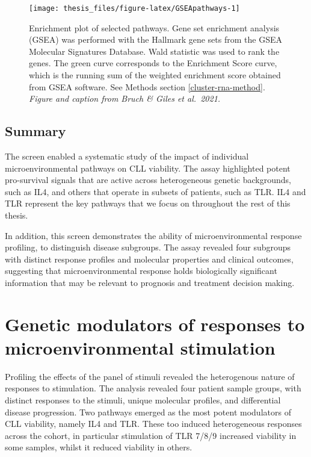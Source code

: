 \documentclass[11pt, a4paper, twosided]{book}
\begin{document}
\begin{figure}

{\centering \texttt{[image: thesis\_files/figure-latex/GSEApathways-1]} 

}

\caption{Enrichment plot of selected pathways. Gene set enrichment analysis (GSEA) was performed with the Hallmark gene sets from the GSEA Molecular Signatures Database. Wald statistic was used to rank the genes. The green curve corresponds to the Enrichment Score curve, which is the running sum of the weighted enrichment score obtained from GSEA software. See Methods section \ref{cluster-rna-method}. \emph{Figure and caption from Bruch \& Giles et al.~2021.}}\label{fig:GSEApathways}
\end{figure}
\hypertarget{summary}{%
\section{Summary}\label{summary}}

The screen enabled a systematic study of the impact of individual microenvironmental pathways on CLL viability. The assay highlighted potent pro-survival signals that are active across heterogeneous genetic backgrounds, such as IL4, and others that operate in subsets of patients, such as TLR. IL4 and TLR represent the key pathways that we focus on throughout the rest of this thesis.

In addition, this screen demonstrates the ability of microenvironmental response profiling, to distinguish disease subgroups. The assay revealed four subgroups with distinct response profiles and molecular properties and clinical outcomes, suggesting that microenvironmental response holds biologically significant information that may be relevant to prognosis and treatment decision making.

\hypertarget{chapter5}{%
\chapter{Genetic modulators of responses to microenvironmental stimulation}\label{chapter5}}

Profiling the effects of the panel of stimuli revealed the heterogenous nature of responses to stimulation. The analysis revealed four patient sample groups, with distinct responses to the stimuli, unique molecular profiles, and differential disease progression. Two pathways emerged as the most potent modulators of CLL viability, namely IL4 and TLR. These too induced heterogeneous responses across the cohort, in particular stimulation of TLR 7/8/9 increased viability in some samples, whilst it reduced viability in others.
\end{document}
